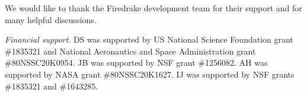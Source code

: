 \documentclass[journal abbreviation, manuscript]{copernicus}
\begin{document}
\appendixtables   %






\begin{acknowledgements}
We would like to thank the Firedrake development team for their support and for many helpful discussions.
\end{acknowledgements}

\textit{Financial support}.
DS was supported by US National Science Foundation grant \#1835321 and National Aeronautics and Space Administration grant \#80NSSC20K0954.
JB was supported by NSF grant \#1256082.
AH was supported by NASA grant \#80NSSC20K1627.
IJ was supported by NSF grants \#1835321 and \#1643285.












\end{document}

